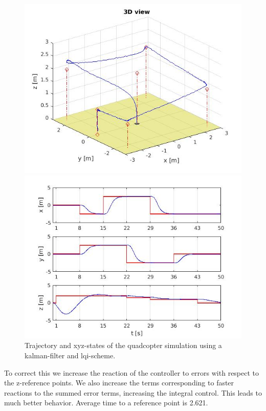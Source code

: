 \documentclass[]{article}
\begin{document}
\begin{figure}[H]
\begin{minipage}{.5\textwidth}
\includegraphics[width=\textwidth]{kaltraj1.jpg}
\end{minipage}%
\begin{minipage}{.5\textwidth}
\includegraphics[width=\textwidth]{kalstate1.jpg}
\end{minipage}
\caption{Trajectory and xyz-states of the quadcopter simulation using a kalman-filter and lqi-scheme.}
\end{figure}

To correct this we increase the reaction of the controller to errors with respect to the z-reference points. We also increase the terms corresponding to faster reactions to the summed error terms, increasing the integral control. This leads to much better behavior. Average time to a reference point is 2.621.
\end{document}
